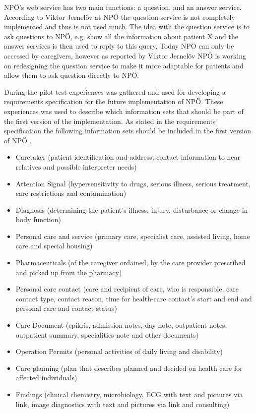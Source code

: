 \documentclass[14pt]{article}
\begin{document}
NPÖ's web service has two main functions: a question, and an answer service. According to Viktor Jernelöv at NPÖ \cite{ViktorJernelov} the question service is not completely implemented and thus is not used much. The idea with the question service is to ask questions to NPÖ, e.g. show all the information about patient X and the answer services is then used to reply to this query. Today NPÖ can only be accessed by caregivers, however as reported by Viktor Jernelöv \cite{ViktorJernelov} NPÖ is working on redesigning the question service to make it more adaptable for patients and allow them to ask question directly to NPÖ.

During the pilot test experiences was gathered and used for developing a requirements specification for the future implementation of NPÖ. These experiences was used to describe which information sets that should be part of the first version of the implementation. As stated in the requirements specification the following information sets should be included in the first version of NPÖ \cite{Npotest}.
\begin{itemize}
\item Caretaker (patient identification and address, contact information to near relatives and possible interpreter needs)
\item Attention Signal (hypersensitivity to drugs, serious illness, serious treatment, care restrictions and contamination)
\item Diagnosis (determining the patient's illness, injury, disturbance or change in body function)
\item Personal care and service (primary care, specialist care, assisted living, home care and special housing)
\item Pharmaceuticals (of the caregiver ordained, by the care provider prescribed and picked up from the pharmacy)
\item Personal care contact (care and recipient of care, who is responsible, care contact type, contact reason, time for health-care contact's start and end and personal care and contact status)
\item Care Document (epikris, admission notes, day note, outpatient notes, outpatient summary, specialities note and other documents)
\item Operation Permits (personal activities of daily living and disability)
\item Care planning (plan that describes planned and decided on health care for affected individuals)
\item Findings (clinical chemistry, microbiology, ECG with text and pictures via link, image diagnostics with text and pictures via link and consulting)
\end{itemize}
\end{document}
